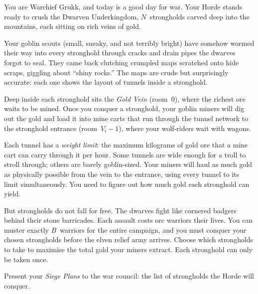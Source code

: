 
\setlength{\parindent}{0pt}
\setlength{\parskip}{6pt}

You are Warchief Grukk, and today is a good day for war.
Your Horde stands ready to crush the Dwarven Underkingdom,
$N$~strongholds carved deep into the mountains, each sitting on rich
veins of gold.

Your goblin scouts (small, sneaky, and not terribly bright) have
somehow wormed their way into every stronghold through cracks and drain
pipes the dwarves forgot to seal. They came back clutching crumpled
maps scratched onto hide scraps, giggling about ``shiny rocks.''
The maps are crude but surprisingly accurate: each one shows the layout
of tunnels inside a stronghold.

Deep inside each stronghold sits the \emph{Gold Vein} (room~$0$),
where the richest ore waits to be mined. Once you conquer a stronghold,
your goblin miners will dig out the gold and load it into mine carts
that run through the tunnel network to the stronghold entrance
(room~$V_i - 1$), where your wolf-riders wait with wagons.

Each tunnel has a \emph{weight limit}: the maximum kilograms of gold
ore that a mine cart can carry through it per hour. Some tunnels are
wide enough for a troll to stroll through; others are barely
goblin-sized. Your miners will haul as much gold as physically possible
from the vein to the entrance, using every tunnel to its limit
simultaneously. You need to figure out how much gold each stronghold
can yield.

But strongholds do not fall for free. The dwarves fight like cornered
badgers behind their stone barricades. Each assault costs orc warriors
their lives. You can muster exactly $B$~warriors for the entire
campaign, and you must conquer your chosen strongholds before the elven
relief army arrives. Choose which strongholds to take to maximise the
total gold your miners extract. Each stronghold can only be taken once.

Present your \emph{Siege Plans} to the war council: the list of
strongholds the Horde will conquer.

